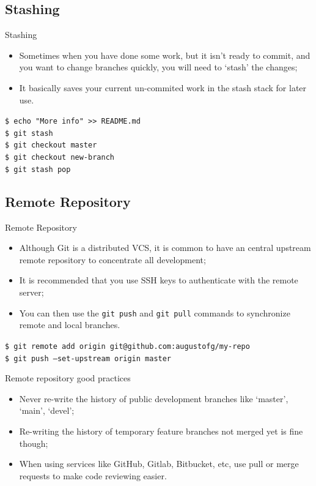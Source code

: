 \documentclass{beamer}
\begin{document}
\subsection{Stashing}
\begin{frame}{Stashing}
  \begin{itemize}
    \item Sometimes when you have done some work, but it isn't ready to commit, and you want to change branches quickly, you will need to `stash' the changes;
    \item It basically saves your current un-commited work in the stash stack for later use.
  \end{itemize}
  \begin{block}{}
    \texttt{\$ echo "More info" >> README.md} \\
    \texttt{\$ git stash} \\
    \texttt{\$ git checkout master} \\
    \texttt{\$ git checkout new-branch} \\
    \texttt{\$ git stash pop}
  \end{block}
\end{frame}

\subsection{Remote Repository}
\begin{frame}{Remote Repository}
  \begin{itemize}
    \item Although Git is a distributed VCS, it is common to have an central upstream remote repository to concentrate all development;
    \item It is recommended that you use SSH keys to authenticate with the remote server;
    \item You can then use the \texttt{git push} and \texttt{git pull} commands to synchronize remote and local branches.
  \end{itemize}
  \begin{block}{}
    \texttt{\$ git remote add origin git@github.com:augustofg/my-repo} \\
    \texttt{\$ git push --set-upstream origin master}
  \end{block}
\end{frame}

\begin{frame}{Remote repository good practices}
  \begin{itemize}
    \item Never re-write the history of public development branches like `master', `main', `devel';
    \item Re-writing the history of temporary feature branches not merged yet is fine though;
    \item When using services like GitHub, Gitlab, Bitbucket, etc, use pull or merge requests to make code reviewing easier.
  \end{itemize}
\end{frame}
\end{document}

